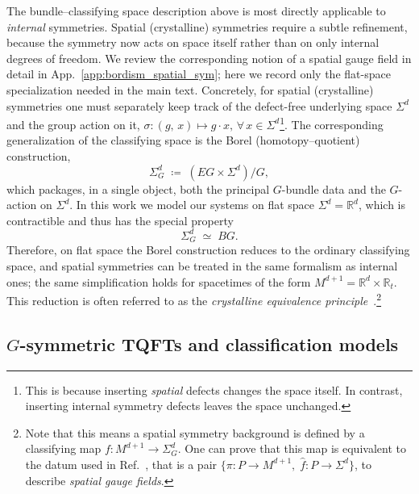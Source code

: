 \documentclass[aps,prx,reprint,superscriptaddress,twocolumn,amsmath,amssymb,amsfonts, nofootinbib]{revtex4-2}
\theoremstyle{apsstyle}
\begin{document}
The bundle–classifying space description above is most directly applicable to \emph{internal} symmetries. 
Spatial (crystalline) symmetries require a subtle refinement, because the symmetry now acts on space itself rather than on only internal degrees of freedom. We review the corresponding notion of a spatial gauge field in detail in App.~\ref{app:bordism_spatial_sym}; here we record only the flat-space specialization needed in the main text.
Concretely, for spatial (crystalline) symmetries one must separately keep track of the defect-free underlying space $\Sigma^{d}$ and the group action on it, $\sigma: (g,\,x)\mapsto g\cdot x,\,\forall \, x\in \Sigma^{d}$\footnote{This is because inserting \emph{spatial} defects changes the space itself. In contrast, inserting internal symmetry defects leaves the space unchanged.}. 
The corresponding generalization of the classifying space is the Borel (homotopy–quotient) construction,
\begin{equation*}
\Sigma^{d}_{G} \;\coloneqq\; (EG \times \Sigma^{d})/G,
\end{equation*}
which packages, in a single object, both the principal $G$-bundle data and the $G$-action on $\Sigma^{d}$. In this work we model our systems on flat space $\Sigma^{d}=\mathbb{R}^{d}$, which is contractible and thus has the special property
\begin{equation*}
\Sigma^{d}_{G}\;\simeq\; BG.
\end{equation*}
Therefore, on flat space the Borel construction reduces to the ordinary classifying space, and spatial symmetries can be treated in the same formalism as internal ones; the same simplification holds for spacetimes of the form $M^{d+1}=\mathbb{R}^{d}\times \mathbb{R}_{t}$. This reduction is often referred to as the \emph{crystalline equivalence principle}~\cite{ThorngrenElse}.\footnote{Note that this means a spatial symmetry background is defined by a classifying map $f:M^{d+1} \to \Sigma^{d}_{G}$. One can prove that this map is equivalent to the datum used in Ref.~\cite{ThorngrenElse}, that is a pair $\{\pi: P \to M^{d+1},\; \hat{f}: P \to \Sigma^{d}\}$, to describe \textit{spatial gauge fields}.}



\subsection{$G$-symmetric TQFTs and classification models}
\label{sec:classification_models}
\end{document}
